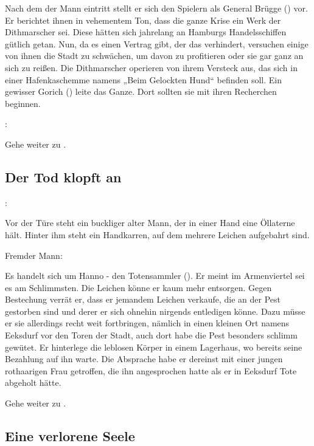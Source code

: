 Nach dem der Mann eintritt stellt er sich den Spielern als General Brügge (\blue{\ref{Brügge}}) vor. Er berichtet ihnen in vehementem Ton, dass die ganze Krise ein Werk der Dithmarscher sei. Diese hätten sich jahrelang an Hamburgs Handelsschiffen gütlich getan. Nun, da es einen Vertrag gibt, der das verhindert, versuchen einige von ihnen die Stadt zu schwächen, um davon zu profitieren oder sie gar ganz an sich zu reißen. Die Dithmarscher operieren von ihrem Versteck aus, das sich in einer Hafenkaschemme namens „Beim Gelockten Hund“ befinden soll. Ein gewisser Gorich (\blue{\ref{Gorich}}) leite das Ganze. Dort sollten sie mit ihren Recherchen beginnen.


:


Gehe weiter zu \blue{\ref{weiter}}.

\subsection*{Der Tod klopft an}
\label{tot}

:

Vor der Türe steht ein buckliger alter Mann, der in einer Hand eine Öllaterne hält. Hinter ihm steht ein Handkarren, auf dem mehrere Leichen aufgebahrt sind.

Fremder Mann:

Es handelt sich um Hanno - den Totensammler (\blue{\ref{Hanno}}). Er meint im Armenviertel sei es am Schlimmsten. Die Leichen könne er kaum mehr entsorgen. Gegen Bestechung verrät er, dass er jemandem Leichen verkaufe, die an der Pest gestorben sind und derer er sich ohnehin nirgends entledigen könne. Dazu müsse er sie allerdings recht weit fortbringen, nämlich in einen kleinen Ort namens Eeksdurf vor den Toren der Stadt, auch dort habe die Pest besonders schlimm gewütet. Er hinterlege die leblosen Körper in einem Lagerhaus, wo bereits seine Bezahlung auf ihn warte. Die Absprache habe er dereinst mit einer jungen rothaarigen Frau getroffen, die ihn angesprochen hatte als er in Eeksdurf Tote abgeholt hätte.

Gehe weiter zu \blue{\ref{weiter}}.

\subsection*{Eine verlorene Seele}
\label{kind}

